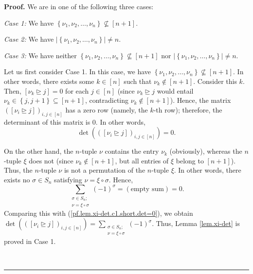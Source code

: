 \documentclass
[numbers=enddot,12pt,final,onecolumn,notitlepage,english]{scrartcl}%
\theoremstyle{definition}
\newenvironment{proof}[1][Proof]{\noindent\textbf{#1.} }{\ \rule{0.5em}{0.5em}}
\let\sumnonlimits\sum
\renewcommand{\sum}{\sumnonlimits\limits}
\newenvironment{vershort}{}{}
\begin{document}
\begin{proof}
We are in one of the following three cases:

\textit{Case 1:} We have $\left\{  \nu_{1},\nu_{2},\ldots,\nu_{n}\right\}
\not \subseteq \left[  n+1\right]  $.

\textit{Case 2:} We have $\left\vert \left\{  \nu_{1},\nu_{2},\ldots,\nu
_{n}\right\}  \right\vert \neq n$.

\textit{Case 3:} We have neither $\left\{  \nu_{1},\nu_{2},\ldots,\nu
_{n}\right\}  \not \subseteq \left[  n+1\right]  $ nor $\left\vert \left\{
\nu_{1},\nu_{2},\ldots,\nu_{n}\right\}  \right\vert \neq n$.\medskip

\begin{vershort}
Let us first consider Case 1. In this case, we have $\left\{  \nu_{1},\nu
_{2},\ldots,\nu_{n}\right\}  \not \subseteq \left[  n+1\right]  $. In other
words, there exists some $k\in\left[  n\right]  $ such that $\nu_{k}%
\notin\left[  n+1\right]  $. Consider this $k$. Then, $\left[  \nu
_{k}\trianglerighteq j\right]  =0$ for each $j\in\left[  n\right]  $ (since
$\nu_{k}\trianglerighteq j$ would entail $\nu_{k}\in\left\{  j,j+1\right\}
\subseteq\left[  n+1\right]  $, contradicting $\nu_{k}\notin\left[
n+1\right]  $). Hence, the matrix $\left(  \left[  \nu_{i}\trianglerighteq
j\right]  \right)  _{i,j\in\left[  n\right]  }$ has a zero row (namely, the
$k$-th row); therefore, the determinant of this matrix is $0$. In other
words,
\begin{equation}
\det\left(  \left(  \left[  \nu_{i}\trianglerighteq j\right]  \right)
_{i,j\in\left[  n\right]  }\right)  =0. \label{pf.lem.xi-det.c1.short.det=0}%
\end{equation}


On the other hand, the $n$-tuple $\nu$ contains the entry $\nu_{k}$
(obviously), whereas the $n$-tuple $\xi$ does not (since $\nu_{k}\notin\left[
n+1\right]  $, but all entries of $\xi$ belong to $\left[  n+1\right]  $).
Thus, the $n$-tuple $\nu$ is not a permutation of the $n$-tuple $\xi$. In
other words, there exists no $\sigma\in S_{n}$ satisfying $\nu=\xi\circ\sigma
$. Hence,%
\[
\sum_{\substack{\sigma\in S_{n};\\\nu=\xi\circ\sigma}}\left(  -1\right)
^{\sigma}=\left(  \text{empty sum}\right)  =0.
\]
Comparing this with (\ref{pf.lem.xi-det.c1.short.det=0}), we obtain
$\det\left(  \left(  \left[  \nu_{i}\trianglerighteq j\right]  \right)
_{i,j\in\left[  n\right]  }\right)  =\sum_{\substack{\sigma\in S_{n};\\\nu
=\xi\circ\sigma}}\left(  -1\right)  ^{\sigma}$. Thus, Lemma \ref{lem.xi-det}
is proved in Case 1. \medskip
\end{vershort}


\end{proof}
\end{document}
